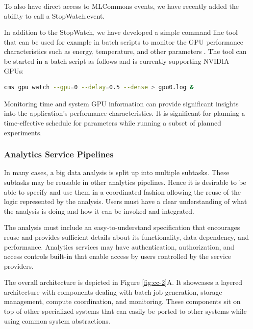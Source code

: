 \documentclass[utf8]{FrontiersinVancouver} %
\begin{document}
To also have direct access to MLCommons events, we have recently added the ability to call a StopWatch.event.


In addition to the StopWatch, we have developed a simple command line tool that can be used for example in batch scripts to monitor the GPU performance characteristics such as energy, temperature, and other parameters \citep{cloudmesh-gpu}. The tool can be started in a batch script as follows and is currently supporting NVIDIA GPUs:


\begin{lstlisting}[language=sh]
    cms gpu watch --gpu=0 --delay=0.5 --dense > gpu0.log &
\end{lstlisting}


Monitoring time and system GPU information can provide significant insights into the application's performance characteristics. It is significant for planning a time-effective schedule for parameters while running a subset of planned experiments.


\subsubsection{Analytics Service Pipelines}

In many cases, a big data analysis is split up into multiple subtasks. These subtasks may be reusable in other analytics pipelines. Hence it is desirable to be able to specify and use them in a coordinated fashion allowing the reuse of the logic represented by the analysis. Users must have a clear understanding of what the analysis is doing and how it can be invoked and integrated.

The analysis must include an easy-to-understand specification that encourages reuse and provides sufficient details about its functionality, data dependency, and performance. Analytics services may have authentication, authorization, and access controls built-in that enable access by users controlled by the service providers.

The overall architecture is depicted in Figure \ref{fig:cc-2}A. It showcases a layered architecture with components dealing with batch job generation, storage management, compute coordination, and monitoring. These components sit on top of other specialized systems that can easily be ported to other systems while using common system abstractions.
\end{document}

